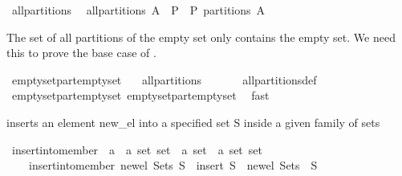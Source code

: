 \begin{isabellebody}
\begin{isamarkuptext}
\end{isamarkuptext}%
\isamarkuptrue%
\isamarkupfalse%
\ all{\isacharunderscore}partitions\ \ \isanewline
{\isachardoublequoteopen}all{\isacharunderscore}partitions\ A\ {\isacharequal}\ {\isacharbraceleft}P\ {\isachardot}\ P\ partitions\ A{\isacharbraceright}{\isachardoublequoteclose}%
\begin{isamarkuptext}%
The set of all partitions of the empty set only contains the empty set.
  We need this to prove the base case of .%
\end{isamarkuptext}%
\isamarkuptrue%
\isamarkupfalse%
\ emptyset{\isacharunderscore}part{\isacharunderscore}emptyset{}{\isacharcolon}\isanewline
\ \ \ {\isachardoublequoteopen}all{\isacharunderscore}partitions\ {\isacharbraceleft}{\isacharbraceright}\ {\isacharequal}\ {\isacharbraceleft}{\isacharbraceleft}{\isacharbraceright}{\isacharbraceright}{\isachardoublequoteclose}\isanewline
%
\isadelimproof
\ \ %
\endisadelimproof
%
\isatagproof
{}\isamarkupfalse%
\ all{\isacharunderscore}partitions{\isacharunderscore}def\ \isamarkupfalse%
\ emptyset{\isacharunderscore}part{\isacharunderscore}emptyset{}\ emptyset{\isacharunderscore}part{\isacharunderscore}emptyset{}\ \isamarkupfalse%
\ fast%
\endisatagproof
{\isafoldproof}%
%
\isadelimproof
%
\endisadelimproof
%
\begin{isamarkuptext}%
inserts an element new_el into a specified set S inside a given family of sets%
\end{isamarkuptext}%
\isamarkuptrue%
\isamarkupfalse%
\ insert{\isacharunderscore}into{\isacharunderscore}member\ {\isacharcolon}{\isacharcolon}\ {\isachardoublequoteopen}{\isacharprime}a\ {\isasymRightarrow}\ {\isacharprime}a\ set\ set\ {\isasymRightarrow}\ {\isacharprime}a\ set\ {\isasymRightarrow}\ {\isacharprime}a\ set\ set{\isachardoublequoteclose}\isanewline
\ \ \ \ {\isachardoublequoteopen}insert{\isacharunderscore}into{\isacharunderscore}member\ new{\isacharunderscore}el\ Sets\ S\ {\isacharequal}\ insert\ {\isacharparenleft}S\ {\isasymunion}\ {\isacharbraceleft}new{\isacharunderscore}el{\isacharbraceright}{\isacharparenright}\ {\isacharparenleft}Sets\ {\isacharminus}\ {\isacharbraceleft}S{\isacharbraceright}{\isacharparenright}{\isachardoublequoteclose}%
\begin{isamarkuptext}%

\end{isamarkuptext}
\end{isabellebody}
